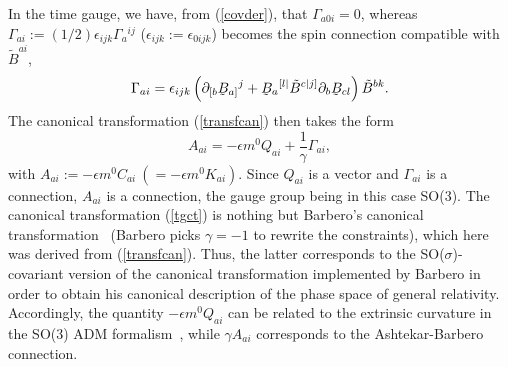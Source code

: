 \documentclass[aps,prd,reprint,showpacs,longbibliography,superscriptaddress, groupedaddres,
titlepage,nofootinbib]{revtex4-1} %
\begin{document}
In the time gauge, we have, from (\ref{covder}), that $\Gamma_{a0i}=0$, whereas $\Gamma_{ai}:=(1/2)\epsilon_{ijk}\Gamma_a{}^{ij}$ ($\epsilon_{ijk}:=\epsilon_{0ijk}$) becomes the spin connection compatible with $\tilde{B}^{ai}$,
\begin{equation}\label{spinconn}
	\Gamma_{ai}=\epsilon_{ijk}\left(\partial_{[b}\underaccent{\tilde}{B}_{a]}{}^j+\underaccent{\tilde}{B}_a{}^{[l|}\tilde{B}^{c|j]}\partial_b\underaccent{\tilde}{B}_{cl}\right)\tilde{B}^{bk}.
\end{equation}
 The canonical transformation (\ref{transfcan}) then takes the form
\begin{equation}\label{tgct}
	A_{ai}=-\epsilon m^0Q_{ai}+\frac{1}{\gamma}\Gamma_{ai},
\end{equation}
with $A_{ai}:=-\epsilon m^0C_{ai}\ (=-\epsilon m^0K_{ai})$. Since $Q_{ai}$ is a vector and $\Gamma_{ai}$ is a connection, $A_{ai}$ is a connection, the gauge group being in this case SO(3). The canonical transformation (\ref{tgct}) is nothing but Barbero's canonical transformation~\cite{Barbero} (Barbero picks $\gamma=-1$ to rewrite the constraints), which here was derived from (\ref{transfcan}). Thus, the latter corresponds to the SO($\sigma$)-covariant version of the canonical transformation implemented by Barbero in order to obtain his canonical description of the phase space of general relativity. Accordingly, the quantity $-\epsilon m^0Q_{ai}$ can be related to the extrinsic curvature in the SO(3) ADM formalism~\cite{AshBalJo,ashtekar1991lectures}, while $\gamma A_{ai}$ corresponds to the Ashtekar-Barbero connection. 
\end{document}

